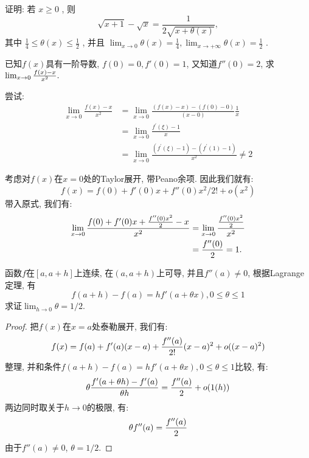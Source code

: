 
\begin{prob}
    证明: 若  $x \geqslant 0$ , 则
   $$
   \sqrt{x+1}-\sqrt{x}=\frac{1}{2 \sqrt{x+\theta(x)}},
   $$
   其中  $\frac{1}{4} \leq \theta(x) \leq \frac{1}{2}$ , 并且  $\lim _{x \rightarrow 0} \theta(x)=\frac{1}{4}, \lim _{x \rightarrow+\infty} \theta(x)=\frac{1}{2}$ .
\end{prob}
\begin{sol}
    
\end{sol}


\begin{prob}
    已知$f(x)$具有一阶导数, $f(0)=0, f'(0)=1$, 又知道$f''(0)=2$, 求$\lim_{x\to 0} {f(x)-x\over x^2}.$
\end{prob}

尝试:
\begin{align*}
    \lim _{x \rightarrow 0} \frac{f(x)-x}{x^{2}} &=\lim _{x \rightarrow 0} \frac{(f(x)-x)-(f(0)-0)}{(x-0)} \frac{1}{x} \\
    &=\lim _{x \rightarrow 0} \frac{f^{\prime}(\xi)-1}{x} \\
    &=\lim _{x \rightarrow 0} \frac{\left(f^{\prime}(\xi)-1\right)-\left(f^{\prime}(1)-1\right)}{x^{2}}\neq 2
\end{align*}

\begin{sol}
    考虑对$f(x)$在$x=0$处的Taylor展开, 带Peano余项. 因此我们就有: 
    $$
    f(x)=f(0)+f'(0)x+f''(0)x^2/2! + o(x^2)
    $$
    带入原式, 我们有: 
    \begin{align*}
        \lim_{x\to 0} {f(0)+f'(0)x+{f''(0)x^2\over 2} -x \over x^2}&=\lim_{x\to 0} {{f''(0)x^2\over 2}  \over x^2}\\
        &={f''(0)\over 2} = 1. 
    \end{align*}
\end{sol}


\begin{prob}\label{lem:a0}%
    函数$f$在$[a, a+h]$上连续, 在$(a, a+h)$上可导, 并且$f''(a)\neq 0$, 根据Lagrange定理, 有
    $$
    f(a+h)-f(a)=hf'(a+\theta x), 0\leq \theta \leq 1
    $$
    求证$\lim_{h\to 0} \theta = 1/2$.

\end{prob}

\begin{proof}
    把$f(x)$在$x=a$处泰勒展开, 我们有:
    $$
    f(x)=f(a) + f'(a)(x-a) + {f''(a)\over 2!}(x-a)^2+o((x-a)^2)
    $$
    整理, 并和条件$f(a+h)-f(a)=hf'(a+\theta x), 0\leq \theta \leq 1$比较, 有: 
    $$
    \theta {f'(a+\theta h)-f'(a) \over \theta h} = {f''(a)\over 2}+o(1(h))
    $$
    两边同时取关于$h\to 0$的极限, 有: 
    $$
    \theta f''(a) = {f''(a)\over 2}
    $$
    由于$f''(a)\neq 0$, $\theta = 1/2$. 
\end{proof}


